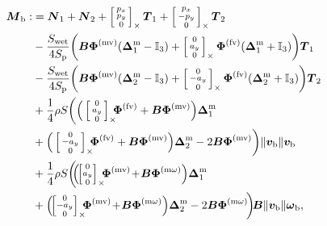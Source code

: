 % 
\begin{align} 
\label{eq:Mb}
 \boldsymbol{M}_{\text{b}} :&=\boldsymbol{N}_{1} + \boldsymbol{N}_{2} + \skewsym{\smallm{p_x\\ p_y\\ 0}} \boldsymbol{T}_{1} + \skewsym{\smallm{p_x\\ - p_y\\ 0}} \boldsymbol{T}_{2}\\
    \nonumber
  &- \frac{S_{\text{wet}}}{4S_{\text{p}}} \bigg( \boldsymbol{B} \boldsymbol{\Phi}^{\text{(mv)}} (\boldsymbol{\Delta}^{\text{m}}_1- \mathbb{I}_{3} ) + \skewsym{\smallm{0 \\ a_y \\ 0}} \boldsymbol{\Phi}^{\text{(fv)}} (\boldsymbol{\Delta}^{\text{m}}_1 +\mathbb{I}_{3} ) \bigg) \boldsymbol{T}_{1} \\
    \nonumber
  & - \frac{S_{\text{wet}}}{4S_{\text{p}}} \bigg( \boldsymbol{B} \boldsymbol{\Phi}^{\text{(mv)}} (\boldsymbol{\Delta}^{\text{m}}_2 - \mathbb{I}_{3} ) +  \skewsym{\smallm{0 \\ - a_y \\ 0}} \boldsymbol{\Phi}^{\text{(fv)}} (\boldsymbol{\Delta}^{\text{m}}_2 + \mathbb{I}_{3}) \bigg) \boldsymbol{T}_{2} \\
    \nonumber
  & + \frac{1}{4} \rho S  \bigg( \Big(\skewsym{\smallm{0 \\ a_y \\ 0}} \!\!\! \boldsymbol{\Phi}^{\text{(fv)}}  + \boldsymbol{B} \boldsymbol{\Phi}^{\text{(mv)}} \Big) \boldsymbol{\Delta}^{\text{m}}_1 \\
    \nonumber
  &  + \Big( \skewsym{\smallm{0 \\ - a_y \\ 0}} \!\!\! \boldsymbol{\Phi}^{\text{(fv)}} + \boldsymbol{B} \boldsymbol{\Phi}^{\text{(mv)}}  \Big) \boldsymbol{\Delta}^{\text{m}}_2 - 2 \boldsymbol{B} \boldsymbol{\Phi}^{\text{(mv)}}  \bigg) \lVert \boldsymbol{v_{\text{b}}} \rVert \boldsymbol{v_{\text{b}}} \\
    \nonumber
  & +\frac{1}{4} \rho S \bigg(\!\! \Big(\!\! \skewsym{\!\smallm{0 \\ a_y \\ 0}\!}\!\!\! \boldsymbol{\Phi}^{\text{(mv)}} \! + \! \boldsymbol{B} \boldsymbol{\Phi}^{\text{(m$\omega$)}} \Big) \boldsymbol{\Delta}^{\text{m}}_1 \\
    \nonumber
  & +  \Big(\!\! \skewsym{\!\smallm{0 \\ - a_y \\ 0}\!} \!\!\! \boldsymbol{\Phi}^{\text{(mv)}} \! + \! \boldsymbol{B} \boldsymbol{\Phi}^{\text{(m$\omega$)}}  \Big) \boldsymbol{\Delta}^{\text{m}}_2 - 2 \boldsymbol{B} \boldsymbol{\Phi}^{\text{(m$\omega$)}}\!  \bigg)\!  \boldsymbol{B}  \lVert \boldsymbol{v_{\text{b}}} \rVert  \boldsymbol{\omega}_{\text{b}} ,
\end{align}
